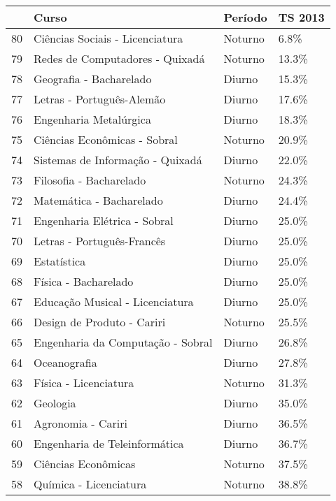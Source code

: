 \begin{tabular}{llll}
\toprule
{} &                               Curso &  Período & TS 2013 \\
\midrule
80 &     Ciências Sociais - Licenciatura &  Noturno &    6.8\% \\
79 &     Redes de Computadores - Quixadá &  Noturno &   13.3\% \\
78 &             Geografia - Bacharelado &   Diurno &   15.3\% \\
77 &           Letras - Português-Alemão &   Diurno &   17.6\% \\
76 &              Engenharia Metalúrgica &   Diurno &   18.3\% \\
75 &        Ciências Econômicas - Sobral &  Noturno &   20.9\% \\
74 &    Sistemas de Informação - Quixadá &   Diurno &   22.0\% \\
73 &             Filosofia - Bacharelado &  Noturno &   24.3\% \\
72 &            Matemática - Bacharelado &   Diurno &   24.4\% \\
71 &        Engenharia Elétrica - Sobral &   Diurno &   25.0\% \\
70 &          Letras - Português-Francês &   Diurno &   25.0\% \\
69 &                         Estatística &   Diurno &   25.0\% \\
68 &                Física - Bacharelado &   Diurno &   25.0\% \\
67 &     Educação Musical - Licenciatura &   Diurno &   25.0\% \\
66 &          Design de Produto - Cariri &  Noturno &   25.5\% \\
65 &   Engenharia da Computação - Sobral &   Diurno &   26.8\% \\
64 &                        Oceanografia &   Diurno &   27.8\% \\
63 &               Física - Licenciatura &  Noturno &   31.3\% \\
62 &                            Geologia &   Diurno &   35.0\% \\
61 &                  Agronomia - Cariri &   Diurno &   36.5\% \\
60 &       Engenharia de Teleinformática &   Diurno &   36.7\% \\
59 &                 Ciências Econômicas &  Noturno &   37.5\% \\
58 &              Química - Licenciatura &  Noturno &   38.8\% \\

\end{tabular}
